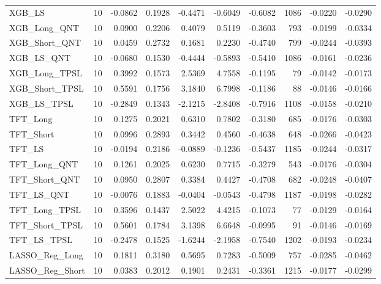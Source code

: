 \begin{tabular}{llrrrrrrrr}
\cline{1-10}
XGB\_LS & 10 & -0.0862 & 0.1928 & -0.4471 & -0.6049 & -0.6082 & 1086 & -0.0220 & -0.0290 \\
\cline{1-10}
XGB\_Long\_QNT & 10 & 0.0900 & 0.2206 & 0.4079 & 0.5119 & -0.3603 & 793 & -0.0199 & -0.0334 \\
\cline{1-10}
XGB\_Short\_QNT & 10 & 0.0459 & 0.2732 & 0.1681 & 0.2230 & -0.4740 & 799 & -0.0244 & -0.0393 \\
\cline{1-10}
XGB\_LS\_QNT & 10 & -0.0680 & 0.1530 & -0.4444 & -0.5893 & -0.5410 & 1086 & -0.0161 & -0.0236 \\
\cline{1-10}
XGB\_Long\_TPSL & 10 & 0.3992 & 0.1573 & 2.5369 & 4.7558 & -0.1195 & 79 & -0.0142 & -0.0173 \\
\cline{1-10}
XGB\_Short\_TPSL & 10 & 0.5591 & 0.1756 & 3.1840 & 6.7998 & -0.1186 & 88 & -0.0146 & -0.0166 \\
\cline{1-10}
XGB\_LS\_TPSL & 10 & -0.2849 & 0.1343 & -2.1215 & -2.8408 & -0.7916 & 1108 & -0.0158 & -0.0210 \\
\cline{1-10}
TFT\_Long & 10 & 0.1275 & 0.2021 & 0.6310 & 0.7802 & -0.3180 & 685 & -0.0176 & -0.0303 \\
\cline{1-10}
TFT\_Short & 10 & 0.0996 & 0.2893 & 0.3442 & 0.4560 & -0.4638 & 648 & -0.0266 & -0.0423 \\
\cline{1-10}
TFT\_LS & 10 & -0.0194 & 0.2186 & -0.0889 & -0.1236 & -0.5437 & 1185 & -0.0244 & -0.0317 \\
\cline{1-10}
TFT\_Long\_QNT & 10 & 0.1261 & 0.2025 & 0.6230 & 0.7715 & -0.3279 & 543 & -0.0176 & -0.0304 \\
\cline{1-10}
TFT\_Short\_QNT & 10 & 0.0950 & 0.2807 & 0.3384 & 0.4427 & -0.4708 & 682 & -0.0248 & -0.0407 \\
\cline{1-10}
TFT\_LS\_QNT & 10 & -0.0076 & 0.1883 & -0.0404 & -0.0543 & -0.4798 & 1187 & -0.0198 & -0.0282 \\
\cline{1-10}
TFT\_Long\_TPSL & 10 & 0.3596 & 0.1437 & 2.5022 & 4.4215 & -0.1073 & 77 & -0.0129 & -0.0164 \\
\cline{1-10}
TFT\_Short\_TPSL & 10 & 0.5601 & 0.1784 & 3.1398 & 6.6648 & -0.0995 & 91 & -0.0146 & -0.0169 \\
\cline{1-10}
TFT\_LS\_TPSL & 10 & -0.2478 & 0.1525 & -1.6244 & -2.1958 & -0.7540 & 1202 & -0.0193 & -0.0234 \\
\cline{1-10}
LASSO\_Reg\_Long & 10 & 0.1811 & 0.3180 & 0.5695 & 0.7283 & -0.5009 & 757 & -0.0285 & -0.0462 \\
\cline{1-10}
LASSO\_Reg\_Short & 10 & 0.0383 & 0.2012 & 0.1901 & 0.2431 & -0.3361 & 1215 & -0.0177 & -0.0299 \\

\end{tabular}
